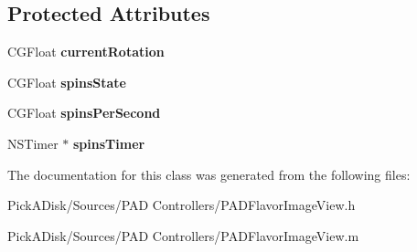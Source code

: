 \subsection*{Protected Attributes}
\begin{DoxyCompactItemize}
\item 
\hypertarget{interface_p_a_d_volume_icon_view_a24f022126c725fd6ff0f5c6873813bed}{
CGFloat {\bfseries currentRotation}}
\label{interface_p_a_d_volume_icon_view_a24f022126c725fd6ff0f5c6873813bed}

\item 
\hypertarget{interface_p_a_d_volume_icon_view_aea7eab3904ad40a02c41fe37c360408a}{
CGFloat {\bfseries spinsState}}
\label{interface_p_a_d_volume_icon_view_aea7eab3904ad40a02c41fe37c360408a}

\item 
\hypertarget{interface_p_a_d_volume_icon_view_ab8c4f4eaee9450da1e3ccee26cf1e9ca}{
CGFloat {\bfseries spinsPerSecond}}
\label{interface_p_a_d_volume_icon_view_ab8c4f4eaee9450da1e3ccee26cf1e9ca}

\item 
\hypertarget{interface_p_a_d_volume_icon_view_aa301970a11b800a18a49e8d030c0f91c}{
NSTimer $\ast$ {\bfseries spinsTimer}}
\label{interface_p_a_d_volume_icon_view_aa301970a11b800a18a49e8d030c0f91c}

\end{DoxyCompactItemize}


The documentation for this class was generated from the following files:\begin{DoxyCompactItemize}
\item 
PickADisk/Sources/PAD Controllers/PADFlavorImageView.h\item 
PickADisk/Sources/PAD Controllers/PADFlavorImageView.m\end{DoxyCompactItemize}
